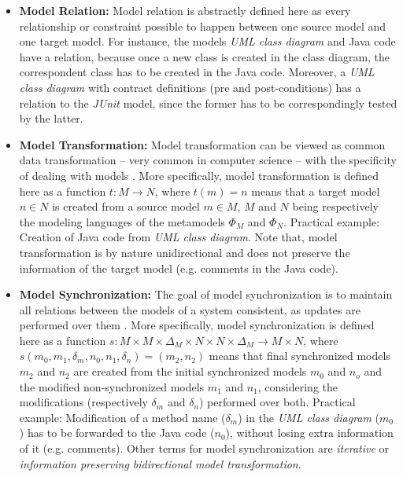 \documentclass[tuberlin,cic,tc,english,noabntcite, oneside]{iiufrgs}
\begin{document}
\begin{itemize}
	\item \textbf{Model Relation:} Model relation is abstractly defined here as every relationship or constraint possible to happen between one source model and one target model. For instance, the models \emph{UML class diagram} and Java code have a relation, because once a new class is created in the class diagram, the correspondent class has to be created in the Java code. Moreover, a \emph{UML class diagram} with contract definitions (pre and post-conditions) has a relation to the \emph{JUnit} model, since the former has to be correspondingly tested by the latter.

	\item \textbf{Model Transformation:} Model transformation can be viewed as common data transformation – very common in computer science – with the specificity of dealing with models \citep{czarnecki2006feature}. More specifically, model transformation is defined here as a function $t : M \rightarrow N$, where $t(m) = n$ means that a target model $n \in N$ is created from a source model $m \in M$, $M$ and $N$ being respectively the modeling languages of the metamodels $\Phi_M$ and $\Phi_N$. Practical example: Creation of Java code from \emph{UML class diagram}. Note that, model transformation is by nature unidirectional and does not preserve the information of the target model (e.g. comments in the Java code).

	\item \textbf{Model Synchronization:} The goal of model synchronization is to maintain all relations between the models of a system consistent, as updates are performed over them \citep{diskin2011model}. More specifically, model synchronization is defined here as a function $s : M \times M \times \Delta_M \times N \times N \times \Delta_M \rightarrow M \times N $, where $s(m_0,m_1,\delta_m,n_0,n_1,\delta_n) = (m_2,n_2)$ means that final synchronized models $m_2$ and $n_2$ are created from the initial synchronized models $m_0$ and $n_o$ and the modified non-synchronized models $m_1$ and $n_1$, considering the modifications (respectively $\delta_m$ and $\delta_n$) performed over both. Practical example: Modification of a method name ($\delta_m$) in the \emph{UML class diagram} ($m_0$) has to be forwarded to the Java code ($n_0$), without losing extra information of it (e.g. comments). Other terms for model synchronization are \emph{iterative} or \emph{information preserving bidirectional model transformation}.


\end{itemize}
\end{document}
